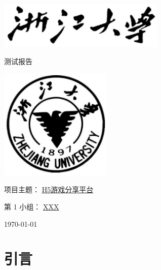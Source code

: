 \documentclass[12pt]{ctexart} %
\begin{document}
\begin{titlepage}
  \centering %
  \includegraphics[width=0.6\textwidth]{zjutitle.jpg} %
  
  \vspace{2cm} %
  
  {\fontsize{36}{48}\selectfont{} 测试报告} %
  
  \vspace{2cm} %
  
  \includegraphics[width=0.4\textwidth]{zjulogo.jpg} %
  
  \vspace{2cm}
  
  {\Huge{} 项目主题： \underline{H5游戏分享平台}} %
  
  \vspace{1cm}

  {\Large{} 第 1 小组： \underline{XXX}} %
  
  \vspace{1cm} %
  
  {\Large{} \today} %

\end{titlepage}

\newpage
\tableofcontents %
\newpage

\section{引言}
\end{document}
